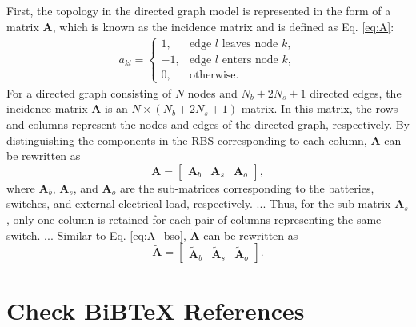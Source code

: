 \documentclass[a4paper]{article}
\begin{document}
First, the topology in the directed graph model is represented in the form of a matrix $\boldsymbol{A}$, which is known as the incidence matrix and is defined as Eq. \eqref{eq:A}:
\begin{align}\label{eq:A}
    a_{kl}=
    \begin{cases}
        1,  & \text{edge $l$ leaves node $k$},\\
        -1, & \text{edge $l$ enters node $k$},\\
        0,  & \text{otherwise}.
    \end{cases}
\end{align}
For a directed graph consisting of $N$ nodes and $N_b+2N_s+1$ directed edges, the incidence matrix $\boldsymbol{A}$ is an $N\times(N_b+2N_s+1)$ matrix. 
In this matrix, the rows and columns represent the nodes and edges of the directed graph, respectively.
By distinguishing the components in the RBS corresponding to each column, $\boldsymbol{A}$ can be rewritten as
\begin{equation}\label{eq:A_bso}
    \boldsymbol{A} =
    \begin{bmatrix}
        \boldsymbol{A}_b & \boldsymbol{A}_s & \boldsymbol{A}_o
    \end{bmatrix},
\end{equation}
where $\boldsymbol{A}_b$, $\boldsymbol{A}_s$, and $\boldsymbol{A}_o$ are the sub-matrices corresponding to the batteries, switches, and external electrical load, respectively.
...
Thus, for the sub-matrix $\boldsymbol{A}_s$, only one column is retained for each pair of columns representing the same switch.
...
Similar to Eq. \eqref{eq:A_bso}, $\boldsymbol{\tilde{A}}$ can be rewritten as
\begin{equation}\label{eq:A_bso_tilde}
    \boldsymbol{\tilde{A}} =
    \begin{bmatrix}
        \boldsymbol{\tilde{A}}_b & \boldsymbol{\tilde{A}}_s & \boldsymbol{\tilde{A}}_o
    \end{bmatrix}.
\end{equation}

\section{Check BiBTeX References}



\end{document}

